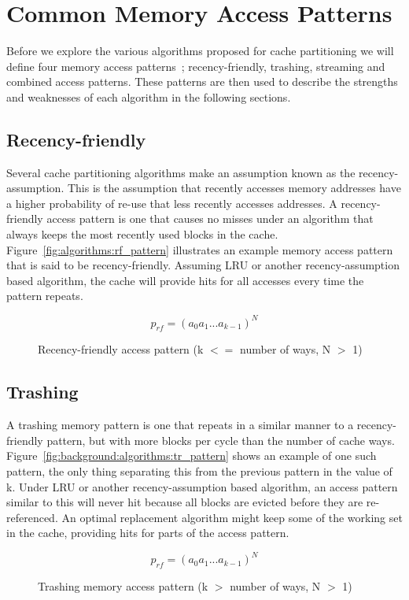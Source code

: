 \section{Common Memory Access Patterns}
Before we explore the various algorithms proposed for cache partitioning we will define four memory access patterns~\cite{Jaleel2010}; recency-friendly, trashing, streaming and combined access patterns.
These patterns are then used to describe the strengths and weaknesses of each algorithm in the following sections.

\subsection{Recency-friendly}
Several cache partitioning algorithms make an assumption known as the recency-assumption.
This is the assumption that recently accesses memory addresses have a higher probability of re-use that less recently accesses addresses.
A recency-friendly access pattern is one that causes no misses under an algorithm that always keeps the most recently used blocks in the cache.
Figure~\ref{fig:algorithms:rf_pattern} illustrates an example memory access pattern that is said to be recency-friendly.
Assuming LRU or another recency-assumption based algorithm, the cache will provide hits for all accesses every time the pattern repeats.

\begin{figure}[ht]
\centering
\begin{equation} \label{fig::algorithms:rf_pattern}
p_{rf} = (a_0 a_1 ... a_{k-1})^N
\end{equation}
\caption{Recency-friendly access pattern (k $<=$ number of ways, N $>$ 1)}
\end{figure}

\subsection{Trashing}
A trashing memory pattern is one that repeats in a similar manner to a recency-friendly pattern, but with more blocks per cycle than the number of cache ways. 
Figure~\ref{fig:background:algorithms:tr_pattern} shows an example of one such pattern, the only thing separating this from the previous pattern in the value of k.
Under LRU or another recency-assumption based algorithm, an access pattern similar to this will never hit because all blocks are evicted before they are re-referenced.
An optimal replacement algorithm might keep some of the working set in the cache, providing hits for parts of the access pattern.
\begin{figure}[ht]
\centering
\begin{equation} \label{fig:algorithms:tr_pattern}
p_{rf} = (a_0 a_1 ... a_{k-1})^N
\end{equation}
\caption{Trashing memory access pattern (k $>$ number of ways, N $>$ 1)}
\end{figure}

